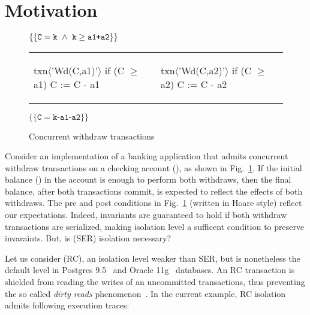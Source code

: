 \section{Motivation}

\begin{figure}
\centering
$\{\{\texttt{C}=\texttt{k} ~\wedge~ \texttt{k}\ge\texttt{a1+a2}\}\}$
\begin{tabular}{l||l}
\begin{txnimpcode}
  txn$\langle$'Wd(C,a1)'$\rangle${
    if (C $\ge$ a1) {
      C := C - a1
    }
  }
\end{txnimpcode}
&
\begin{txnimpcode}
  txn$\langle$'Wd(C,a2)'$\rangle${
    if (C $\ge$ a2) {
      C := C - a2
    }
  }
\end{txnimpcode}
\\
\end{tabular}
$\{\{\texttt{C}=\texttt{k-a1-a2}\}\}$

\caption{Concurrent withdraw transactions}
\label{fig:motiv-eg-1}
\end{figure}

Consider an implementation of a banking application that admits
concurrent withdraw transactions on a checking account (), as
shown in Fig.~\ref{fig:motiv-eg-1}. If the initial balance () in
the account is enough to perform both withdraws, then the final
balance, after both transactions commit, is expected to reflect the
effects of both withdraws. The pre and post conditions in
Fig.~\ref{fig:motiv-eg-1} (written in Hoare style) reflect our
expectations. Indeed, invariants are guaranteed to hold if both
withdraw transactions are serialized, making 
isolation level a sufficent condition to preserve invaraints. But, is
 (SER) isolation necessary?

Let us consider  (RC), an isolation level weaker
than SER, but is nonetheless the default level in Postgres
9.5~\cite{postgres95} and Oracle 11g~\cite{oracle11g} databases. An RC
transaction is shielded from reading the writes of an uncommitted
transactions, thus preventing the so called \emph{dirty reads}
phenomenon~\cite{berenson}. In the current example, RC isolation
admits following execution traces:

